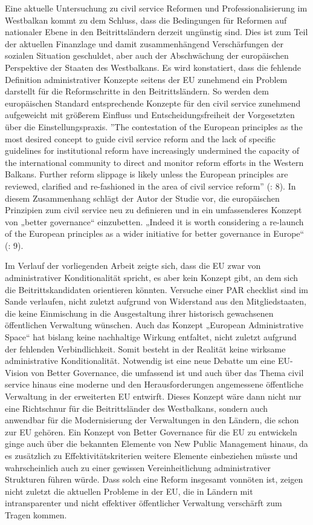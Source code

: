 Eine aktuelle Untersuchung zu civil service Reformen und Professionalisierung im Westbalkan kommt zu dem Schluss, dass die Bedingungen für Reformen auf nationaler Ebene in den Beitrittsländern derzeit ungünstig sind. Dies ist zum Teil der aktuellen Finanzlage und damit zusammenhängend Verschärfungen der sozialen Situation geschuldet, aber auch der Abschwächung der europäischen Perspektive der Staaten des Westbalkans. Es wird konstatiert, dass die fehlende Definition administrativer Konzepte seitens der EU zunehmend ein Problem darstellt für die Reformschritte in den Beitrittsländern. So werden dem europäischen Standard entsprechende Konzepte für den civil service zunehmend aufgeweicht mit größerem Einfluss und Entscheidungsfreiheit der Vorgesetzten über die Einstellungspraxis. ”The contestation of the European principles as the most desired concept to guide civil service reform and the lack of specific guidelines for institutional reform have increasingly undermined the capacity of the international community to direct and monitor reform efforts in the Western Balkans. Further reform slippage is likely unless the European principles are reviewed, clarified and re-fashioned in the area of civil service reform” (\cite{meyersah12}: 8). In diesem Zusammenhang schlägt der Autor der Studie vor, die europäischen Prinzipien zum civil service neu zu definieren und in ein umfassenderes Konzept von „better governance“ einzubetten. „Indeed it is worth considering a re-launch of the European principles as a wider initiative for better governance in Europe“ (\cite{meyersah12}: 9). \par
Im Verlauf der vorliegenden Arbeit zeigte sich, dass die EU zwar von administrativer Konditionalität spricht, es aber kein Konzept gibt, an dem sich die Beitrittskandidaten orientieren könnten. Versuche einer PAR checklist sind im Sande verlaufen, nicht zuletzt aufgrund von Widerstand aus den Mitgliedstaaten, die keine Einmischung in die Ausgestaltung ihrer historisch gewachsenen öffentlichen Verwaltung wünschen. Auch das Konzept „European Administrative Space“ hat bislang keine nachhaltige Wirkung entfaltet, nicht zuletzt aufgrund der fehlenden Verbindlichkeit. Somit besteht in der Realität keine wirksame administrative Konditionalität. Notwendig ist eine neue Debatte um eine EU-Vision von Better Governance, die umfassend ist und auch über das Thema civil service hinaus eine moderne und den Herausforderungen angemessene öffentliche Verwaltung in der erweiterten EU entwirft. Dieses Konzept wäre dann nicht nur eine Richtschnur für die Beitrittsländer des Westbalkans, sondern auch anwendbar für die Modernisierung der Verwaltungen in den Ländern, die schon zur EU gehören. Ein Konzept von Better Governance für die EU zu entwickeln ginge auch über die bekannten Elemente von New Public Management hinaus, da es zusätzlich zu Effektivitätskriterien weitere Elemente einbeziehen müsste und wahrscheinlich auch zu einer gewissen Vereinheitlichung administrativer Strukturen führen würde. Dass solch eine Reform insgesamt vonnöten ist, zeigen nicht zuletzt die aktuellen Probleme in der EU, die in Ländern mit intransparenter und nicht effektiver öffentlicher Verwaltung verschärft zum Tragen kommen.

